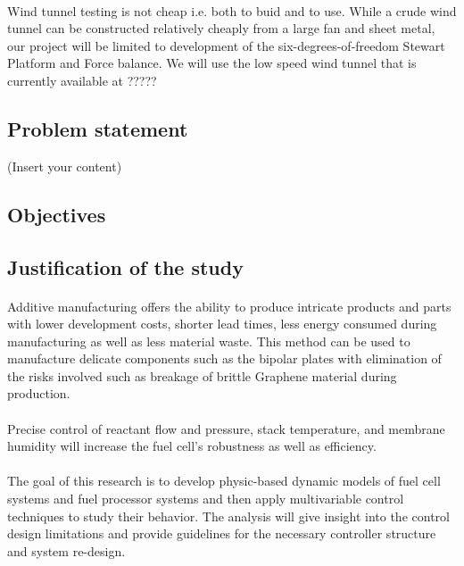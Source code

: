 \paragraph{}Wind tunnel testing is not cheap i.e. both to buid and to use. While a crude wind tunnel can be constructed relatively cheaply from a large fan and
sheet metal, our project will be limited to development of the six-degrees-of-freedom Stewart Platform and Force balance. We will use the low speed wind tunnel that is currently available at ?????
\subsection{Problem statement}
(Insert your content)
\subsection{Objectives}
\cite{stewart_platform_1965}
\subsection{Justification of the study}
\paragraph{}Additive manufacturing offers the ability to produce intricate products and parts with lower development costs, shorter lead times, less energy consumed during manufacturing as well as less material waste. This method can be used to manufacture delicate components such as the bipolar plates with elimination of the risks involved such as breakage of brittle Graphene material during production.     
\paragraph{}Precise control of reactant flow and pressure, stack temperature, and membrane humidity will increase the fuel cell’s robustness as well as efficiency.
\paragraph{}The goal of this research is to develop physic-based dynamic models of fuel cell systems and fuel processor systems and then apply multivariable control techniques to study their behavior. The analysis will give insight into the control design limitations and provide guidelines for the necessary controller structure and system re-design.
